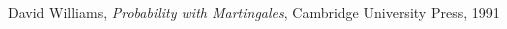 \documentclass{jsreport}
\theoremstyle{definition}
\begin{document}

\begin{thebibliography}{9}
\item David Williams, \textit{Probability with Martingales}, Cambridge University Press, 1991
\end{thebibliography}
\end{document}
